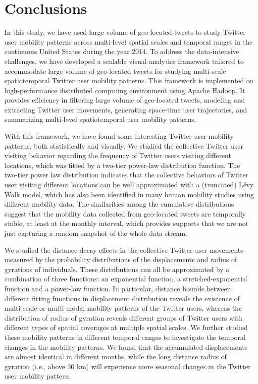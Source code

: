 \documentclass[ijgi,article,submit,moreauthors,pdftex,10pt,a4paper]{mdpi}
\theoremstyle{mdpi}
\newcounter{ex}
\newcounter{re}
\theoremstyle{mdpidefinition}
\begin{document}
\section{Conclusions}
In this study, we have used large volume of geo-located tweets to study Twitter user mobility patterns across multi-level spatial scales and temporal ranges in the continuous United States during the year 2014. 
To address the data-intensive challenges, we have developed a scalable visual-analytics framework tailored to accommodate large volume of geo-located tweets for studying multi-scale spatiotemporal Twitter user mobility patterns.
This framework is implemented on high-performance distributed computing environment using Apache Hadoop.
It provides efficiency in filtering large volume of geo-located tweets, modeling and extracting Twitter user movements, generating space-time user trajectories, and summarizing multi-level spatiotemporal user mobility patterns.

With this framework, we have found some interesting Twitter user mobility patterns, both statistically and visually.
We studied the collective Twitter user visiting behavior regarding the frequency of Twitter users visiting different locations, which was fitted by a two-tier power-law distribution function.
The two-tier power law distribution indicates that the collective behaviors of Twitter user visiting different locations can be well approximated with a (truncated) L\'{e}vy Walk model, which has also been identified in many human mobility studies using different mobility data.
The similarities among the cumulative distributions suggest that the mobility data collected from geo-located tweets are temporally stable, at least at the monthly interval, which provides supports that we are not just capturing a random snapshot of the whole data stream. 

We studied the distance decay effects in the collective Twitter user movements measured by the probability distributions of the displacements and radius of gyrations of individuals. 
These distributions can all be approximated by a combination of three functions: an exponential function, a stretched-exponential function and a power-law function. In particular, distance bounds between different fitting functions in displacement distribution reveals the existence of multi-scale or multi-modal mobility patterns of the Twitter users, whereas the distribution of radius of gyration reveals different groups of Twitter users with different types of spatial coverages at multiple spatial scales.   
We further studied these mobility patterns in different temporal ranges to investigate the temporal changes in the mobility patterns. 
We found that the accumulated displacements are almost identical in different months, while the long distance radius of gyration (i.e., above 30 km) will experience more seasonal changes in the Twitter user mobility pattern.
\end{document}
